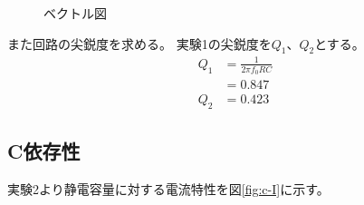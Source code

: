 \documentclass[11pt,a4paper,fleqn]{jsarticle}
\begin{document}
\begin{figure}[H]
\caption{ベクトル図}
\end{figure}

また回路の尖鋭度を求める。
実験1の尖鋭度を$Q_{1}$、$Q_{2}$とする。
\begin{align}
Q_{1}&=\frac{1}{2\pi f_{0}RC}\nonumber\\
&=0.847\label{eq:q1}\\
Q_{2}&=0.423\label{eq:q2}
\end{align}
\subsection{C依存性}
実験2より静電容量に対する電流特性を図\ref{fig:c-I}に示す。
\begin{figure}[H]
\end{figure}
%
\end{document}
